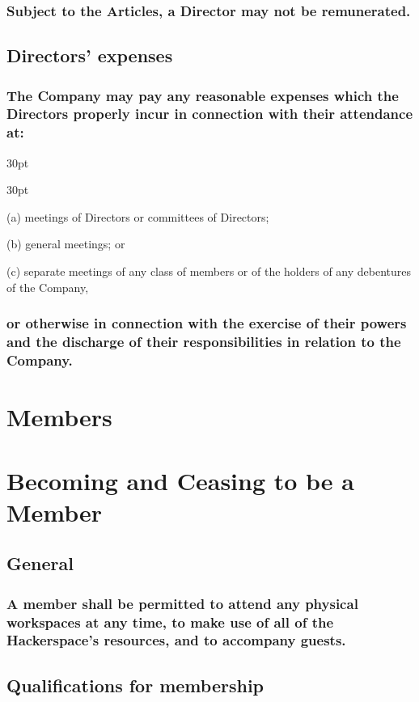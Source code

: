\documentclass[12pt]{article}
\def\clauseindent{30pt}
\newenvironment{subindentlist}{\begin{adjustwidth}{\clauseindent}{}\begin{labeledlist}{\clauseindent}}{\end{labeledlist}\end{adjustwidth}}
\begin{document}
\subsubsection{Subject to the Articles, a Director may not be remunerated.}

\subsection{Directors' expenses}
\subsubsection{The Company may pay any reasonable expenses which the Directors properly incur in connection with their attendance at:}
\begin{subindentlist}
    \item [(a)] meetings of Directors or committees of Directors;
    \item [(b)] general meetings; or
    \item [(c)] separate meetings of any class of members or of the holders of any debentures of the Company,
\end{subindentlist}
\subsubsection{or otherwise in connection with the exercise of their powers and the discharge of their responsibilities in relation to the Company.}

\section*{Members}
\section*{Becoming and Ceasing to be a Member}

\subsection{General}
\subsubsection{A member shall be permitted to attend any physical workspaces at any time, to make use of all of the Hackerspace's resources, and to accompany guests.}

\subsection{Qualifications for membership}
\end{document}
